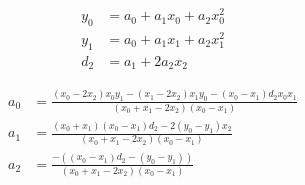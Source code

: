\begin{align}
  y_0 & = a_0+a_1 x_0+a_2 x_0^{2}  \\
   y_1 & = a_0+a_1 x_1+a_2 x_1^{2}  \\
   d_2 & = a_1+2 a_2 x_2  
\end{align}

 
\begin{align}
   a_0 & = \frac
{\left(x_0 - 2 x_2\right) x_0 y_1 - \left(x_1 - 2 x_2\right) x_1 y_0 - \left(x_0 -  x_1\right) d_2 x_0 x_1}
{\left(x_0+x_1 - 2 x_2\right) \left(x_0 - x_1 \right)} \\
   a_1 & = \frac
{\left(x_0+x_1\right) \left(x_0 - x_1\right) d_2 - 2  \left(y_0 - y_1\right) x_2}
{\left(x_0+x_1 - 2 x_2\right) \left(x_0 - x_1 \right)} \\
   a_2 & = \frac
{ - \left(\left(x_0 - x_1\right) d_2 - \left(y_0 - y_1 \right)\right)}
{\left(x_0+x_1 - 2 x_2\right) \left(x_0 - x_1\right) } 
\end{align}
